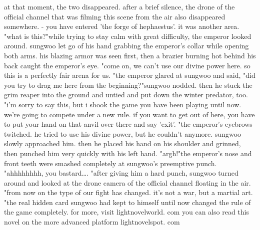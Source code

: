 at that moment, the two disappeared.
 after a brief silence, the drone of the official channel that was filming this scene from the air also disappeared somewhere.
- you have entered 'the forge of hephaestus'.
it was another area.
"what is this?"while trying to stay calm with great difficulty, the emperor looked around.
 sungwoo let go of his hand grabbing the emperor's collar while opening both arms.
his blazing armor was seen first, then a brazier burning hot behind his back caught the emperor's eye.
"come on, we can't use our divine power here.
 so this is a perfectly fair arena for us.
"the emperor glared at sungwoo and said, "did you try to drag me here from the beginning?"sungwoo nodded.
 then he stuck the grim reaper into the ground and untied and put down the winter predator, too.
 "i'm sorry to say this, but i shook the game you have been playing until now.
 we're going to compete under a new rule.
 if you want to get out of here, you have to put your hand on that anvil over there and say 'exit'.
"the emperor's eyebrows twitched.
 he tried to use his divine power, but he couldn't anymore.
 sungwoo slowly approached him.
 then he placed his hand on his shoulder and grinned, then punched him very quickly with his left hand.
"argh!"the emperor's nose and front teeth were smashed completely at sungwoo's preemptive punch.
"ahhhhhhhh, you bastard….
"after giving him a hard punch, sungwoo turned around and looked at the drone camera of the official channel floating in the air.
"from now on the type of our fight has changed.
 it's not a war, but a martial art.
"the real hidden card sungwoo had kept to himself until now changed the rule of the game completely.
for more, visit lightnovelworld.
com you can also read this novel on the more advanced platform lightnovelspot.
com

 